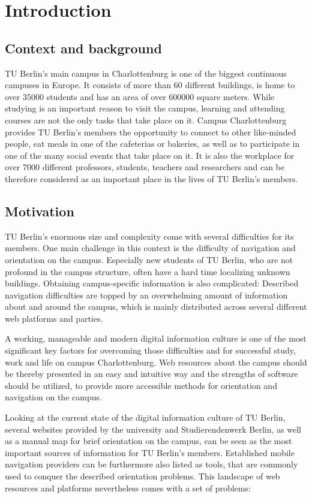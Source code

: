 \chapter{Introduction}
\label{cha:introduction}
\section{Context and background}
TU Berlin's main campus in Charlottenburg is one of the biggest continuous campuses in Europe. It consists of more than 60 different buildings, is home to over 35000 students and has an area of over 600000 square meters. While studying is an important reason to visit the campus, learning and attending courses are not the only tasks that take place on it. Campus Charlottenburg provides TU Berlin's members the opportunity to connect to other like-minded people, eat meals in one of the cafeterias or bakeries, as well as to participate in one of the many social events that take place on it. It is also the workplace for over 7000 different professors, students, teachers and researchers and can be therefore considered as an important place in the lives of TU Berlin's members.

\section{Motivation}
TU Berlin's enormous size and complexity come with several difficulties for its members. One main challenge in this context is the difficulty of navigation and orientation on the campus. Especially new students of TU Berlin, who are not profound in the campus structure, often have a hard time localizing unknown buildings. Obtaining campus-specific information is also complicated: Described navigation difficulties are topped by an overwhelming amount of information about and around the campus, which is mainly distributed across several different web platforms and parties.

A working, manageable and modern digital information culture is one of the most significant key factors for overcoming those difficulties and for successful study, work and life on campus Charlottenburg. Web resources about the campus should be thereby presented in an easy and intuitive way and the strengths of software should be utilized, to provide more accessible methods for orientation and navigation on the campus.

Looking at the current state of the digital information culture of TU Berlin, several websites provided by the university and Studierendenwerk Berlin, as well as a manual map for brief orientation on the campus, can be seen as the most important sources of information for TU Berlin's members. Established mobile navigation providers can be furthermore also listed as tools, that are commonly used to conquer the described orientation problems. This landscape of web resources and platforms nevertheless comes with a set of problems:

